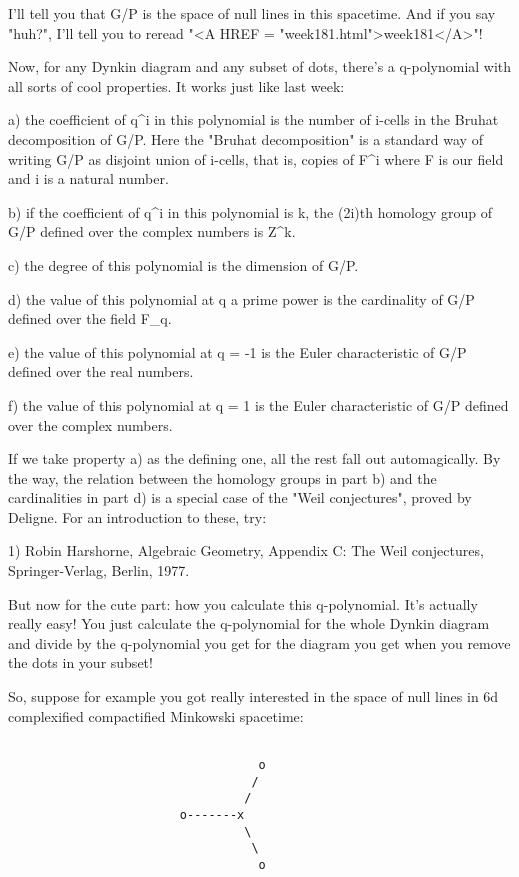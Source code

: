 I'll tell you that G/P is the space of null lines in this spacetime.
And if you say "huh?", I'll tell you to reread "<A HREF = "week181.html">week181</A>"!

Now, for any Dynkin diagram and any subset of dots, there's a 
q-polynomial with all sorts of cool properties.  It works just like
last week: 

a) the coefficient of q^{i} in this polynomial is the number of
i-cells in the Bruhat decomposition of G/P.  Here the "Bruhat
decomposition" is a standard way of writing G/P as disjoint union
of i-cells, that is, copies of F^{i} where F is our field and i
is a natural number.

b) if the coefficient of q^{i} in this polynomial is k, the (2i)th 
homology group of G/P defined over the complex numbers is Z^{k}.

c) the degree of this polynomial is the dimension of G/P.

d) the value of this polynomial at q a prime power is the cardinality
of G/P defined over the field F_{q}.

e) the value of this polynomial at q = -1 is the Euler characteristic
of G/P defined over the real numbers.

f) the value of this polynomial at q = 1 is the Euler characteristic
of G/P defined over the complex numbers.

If we take property a) as the defining one, all the rest fall out
automagically.  By the way, the relation between the homology 
groups in part b) and the cardinalities in part d) is a special 
case of the "Weil conjectures", proved by Deligne.
For an introduction to these, try:

1) 
Robin Harshorne, Algebraic Geometry, Appendix C: The Weil conjectures,
Springer-Verlag, Berlin, 1977.

But now for the cute part: how you calculate this q-polynomial. 
It's actually really easy!  You just calculate the q-polynomial for the
whole Dynkin diagram and divide by the q-polynomial you get for the
diagram you get when you remove the dots in your subset!

So, suppose for example you got really interested in the space of 
null lines in 6d complexified compactified Minkowski spacetime:
  

\begin{verbatim}

                                   o 
                                  /
                                 /
                        o-------x 
                                 \
                                  \
                                   o
\end{verbatim}
    
